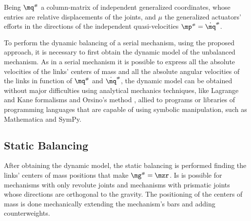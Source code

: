 \documentclass[a4paper,11pt,brazil,fleqn]{article}
\begin{document}
Being $\mq\ssh$ a column-matrix of independent generalized coordinates, whose entries are relative displacements of the joints, and $\mu$ the generalized actuators' efforts in the directions of the independent quasi-velocities $\mp\ssh = \dot{\mq}\ssh$.

To perform the dynamic balancing of a serial mechanism, using the proposed approach, it is necessary to first obtain the dynamic model of the unbalanced mechanism. As in a serial mechanism it is possible to express all the absolute velocities of the links' centers of mass and all the absolute angular velocities of the links in function of $\mq\ssh$ and $\dot{\mq}\ssh$, the dynamic model can be obtained without major difficulties using analytical mechanics techniques, like Lagrange \cite{18tsai} and Kane \cite{19kane} formalisms and Orsino's method \cite{21orsino}, allied to programs or libraries of programming languages that are capable of using symbolic manipulation, such as Mathematica and SymPy.


\subsection{Static Balancing}\label{S02-2}

After obtaining the dynamic model, the static balancing is performed finding the links' centers of mass positions that make $\mg\ssh = \mzr$. Is is possible for mechanisms with only revolute joints and mechanisms with prismatic joints whose directions are orthogonal to the gravity. The positioning of the centers of mass is done mechanically extending the mechanism's bars and adding counterweights.
\end{document}

